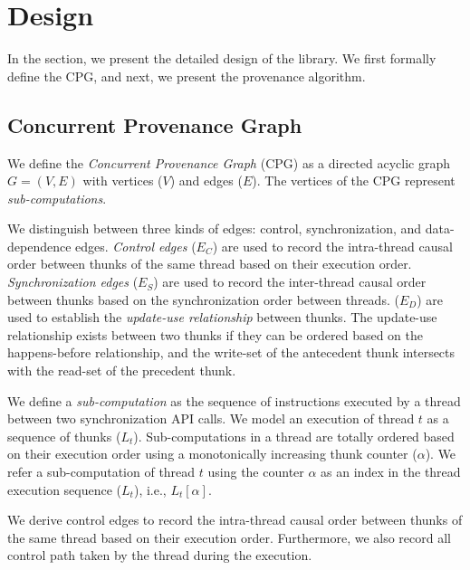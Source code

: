 \section{Design}
\label{sec:algorithms}
In the section, we present the detailed design of the \projecttitle library. We first formally define the CPG, and next, we present the provenance algorithm.

\subsection{Concurrent Provenance Graph}  We define the {\em
Concurrent Provenance Graph} (CPG)  as a directed acyclic graph $G =
(V,E)$ with vertices ($V$) and edges ($E$). The
vertices of the CPG represent {\em sub-computations}. %

We distinguish between three kinds of edges: control, synchronization, and data-dependence edges.
{\em Control edges} ($E_{C}$) are used to record the intra-thread causal order between thunks of the same thread
based on their execution order. {\em Synchronization edges}  ($E_{S}$) are
used to record the inter-thread causal order between thunks based on the synchronization order between threads. ($E_{D}$) are used to establish the {\em update-use relationship} between thunks. The update-use relationship exists between two thunks if they can be  ordered based on the happens-before relationship, and the write-set of the  antecedent thunk intersects with the read-set of the precedent thunk.

 We define a {\em sub-computation}  as the sequence of instructions
executed by a thread between two \pthreads synchronization API calls. We model an execution of thread $t$ as a sequence of thunks
($L_t$). Sub-computations in a thread are totally ordered based on their execution order
using a monotonically increasing thunk counter ($\alpha$). We refer a sub-computation of thread $t$ using the counter $\alpha$ as an index in the thread execution sequence ($L_t$), i.e., $L_t[\alpha]$. 

 We derive control edges to record the intra-thread causal order between thunks of the same thread based on their execution order. Furthermore, we also record all control path taken by the thread during the execution.


